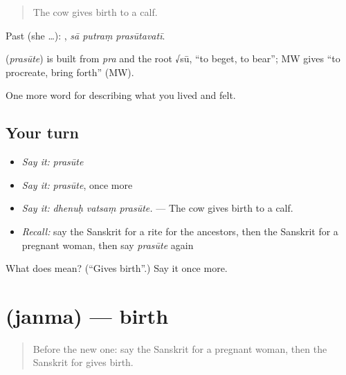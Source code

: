 \begin{quote}
The cow gives birth to a calf.
\end{quote}

Past (she …):   , \emph{sā putraṃ prasūtavatī}.

\begin{cousinweb}
\textbf{} (\emph{prasūte}) is built from \emph{pra} and the root √sū, \textquotedblleft{}to beget, to bear\textquotedblright{}; MW gives \textquotedblleft{}to procreate, bring forth\textquotedblright{} (MW).
\end{cousinweb}

\begin{grammarlens}[title={What you've built}]
One more word for describing what you lived and felt.
\end{grammarlens}

\subsection*{Your turn}
\begin{itemize}
\raggedright
  \item \emph{Say it:} \emph{prasūte}
  \item \emph{Say it:} \emph{prasūte}, once more
  \item \emph{Say it:} \emph{dhenuḥ vatsaṃ prasūte.} — The cow gives birth to a calf.
  \item \emph{Recall:} say the Sanskrit for a rite for the ancestors, then the Sanskrit for a pregnant woman, then say \emph{prasūte} again
\end{itemize}

\begin{tcolorbox}[breakable,colback=teal!4,colframe=teal!35!black,title={Before you move on}]
What does  mean? (\textquotedblleft{}Gives birth\textquotedblright{}.) Say it once more.
\end{tcolorbox}
\section[\texorpdfstring{\sk{जन्म} (janma)}{जन्म (janma)}]{ (janma) — birth}

\label{lesson:SA-C492-janma}



\begin{quote}
Before the new one: say the Sanskrit for a pregnant woman, then the Sanskrit for gives birth.
\end{quote}

